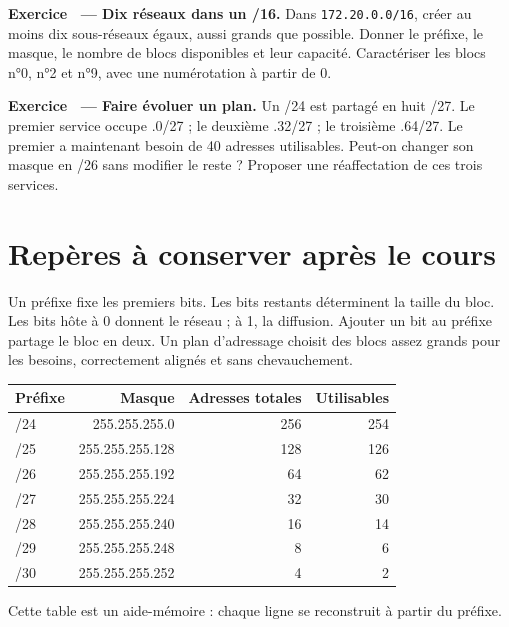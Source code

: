 \documentclass[11pt,a4paper]{article}
\newif\ifcorrige
\newcommand{\ip}[1]{\textcolor{ipred}{\texttt{#1}}}
\newcounter{exo}
\newcommand{\exo}[2]{%
  \Needspace{6cm}\stepcounter{exo}\begin{quest}\textbf{Exercice \theexo\ — #1.} #2\end{quest}}
\newcommand{\zone}[2]{%
  \ifcorrige
    \begin{tcolorbox}[colback=corrbg,colframe=corr,boxrule=0.6pt,arc=1pt,left=5pt,right=5pt,
      fontupper=\small\color{corr}]#2\end{tcolorbox}%
  \else
    \begin{tcolorbox}[colback=white,colframe=black!45,boxrule=0.5pt,arc=1pt,height=#1]\end{tcolorbox}%
  \fi}
\begin{document}
\exo{Dix réseaux dans un /16}{Dans \ip{172.20.0.0/16}, créer au moins dix sous-réseaux égaux,
aussi grands que possible. Donner le préfixe, le masque, le nombre de blocs disponibles et leur capacité.
Caractériser les blocs n°0, n°2 et n°9, avec une numérotation à partir de 0.}
\zone{3.6cm}{$2^3=8<10\leq16=2^4$ : /20, masque \ip{255.255.240.0}, 16 blocs,
4094 adresses utilisables chacun. Pas 16 au troisième octet.
N°0 : \ip{172.20.0.0/20}, utilisables \ip{172.20.0.1} à \ip{172.20.15.254}, diffusion \ip{172.20.15.255}.
N°2 : \ip{172.20.32.0/20}, utilisables \ip{172.20.32.1} à \ip{172.20.47.254}, diffusion \ip{172.20.47.255}.
N°9 : \ip{172.20.144.0/20}, utilisables \ip{172.20.144.1} à \ip{172.20.159.254}, diffusion \ip{172.20.159.255}.
Six blocs restent non affectés si l'on en utilise dix.}

\exo{Faire évoluer un plan}{Un /24 est partagé en huit /27.
Le premier service occupe .0/27 ; le deuxième .32/27 ; le troisième .64/27.
Le premier a maintenant besoin de 40 adresses utilisables. Peut-on changer son masque en /26
sans modifier le reste ? Proposer une réaffectation de ces trois services.}
\zone{2.8cm}{40 adresses exigent /26 (62 utilisables). .0/26 couvre .0 à .63 : il chevauche le deuxième service.
On peut conserver le premier en .0/26, déplacer le deuxième vers .96/27 et conserver le troisième en .64/27.
Les plages deviennent .0–.63, .96–.127 et .64–.95 : aucun chevauchement.
Il faut mettre à jour les configurations concernées, notamment masques, passerelles et DHCP.}

\clearpage
\section*{Repères à conserver après le cours}
\begin{methode}
Un préfixe fixe les premiers bits. Les bits restants déterminent la taille du bloc.
Les bits hôte à 0 donnent le réseau ; à 1, la diffusion. Ajouter un bit au préfixe partage le bloc en deux.
Un plan d'adressage choisit des blocs assez grands pour les besoins, correctement alignés et sans chevauchement.
\end{methode}

\begin{center}\small
\begin{tabular}{@{}lrrr@{}}
\toprule
Préfixe & Masque & Adresses totales & Utilisables\\
\midrule
/24 & 255.255.255.0 & 256 & 254\\
/25 & 255.255.255.128 & 128 & 126\\
/26 & 255.255.255.192 & 64 & 62\\
/27 & 255.255.255.224 & 32 & 30\\
/28 & 255.255.255.240 & 16 & 14\\
/29 & 255.255.255.248 & 8 & 6\\
/30 & 255.255.255.252 & 4 & 2\\
\bottomrule
\end{tabular}
\end{center}
Cette table est un aide-mémoire : chaque ligne se reconstruit à partir du préfixe.
\end{document}
